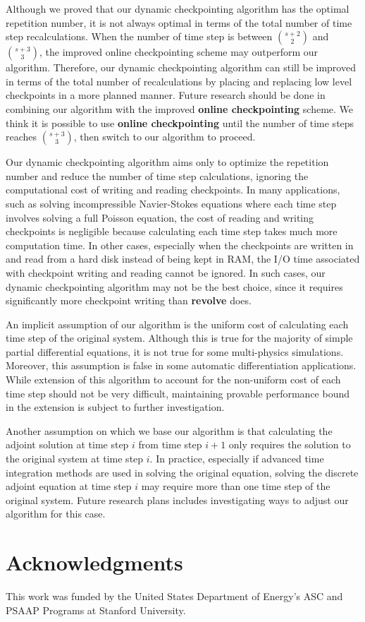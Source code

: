 \documentclass[oneeqnum, onethmnum, onefignum, onetabnum]{siamltex}
\begin{document}
Although we proved that our dynamic checkpointing algorithm has the optimal
repetition number, it is not always optimal in terms of the total number
of time step recalculations.  When the number of time step is between
$\binom{s + 2}{2}$ and $\binom{s + 3}{3}$, the improved online
checkpointing scheme \cite{andrea08} may outperform our algorithm.  Therefore,
our dynamic checkpointing algorithm can still be improved in terms of the total
number of recalculations by placing and replacing low level checkpoints in a
more planned manner.  Future research should be done in combining our algorithm
with the improved {\bf online checkpointing} scheme.  We think it is possible
to use {\bf online checkpointing} until
the number of time steps reaches $\binom{s + 3}{3}$, then switch to our
algorithm to proceed.

Our dynamic checkpointing algorithm aims only to optimize the repetition number
and reduce the number of time step calculations, ignoring the computational
cost of writing and reading checkpoints.  In many applications, such as
solving incompressible Navier-Stokes equations where each time step involves
solving a full Poisson equation, the cost of reading and writing checkpoints
is negligible because calculating each time step takes much more computation
time.  In other cases, especially when the checkpoints are written in and read
from a hard disk instead of being kept in RAM, the I/O time associated with
checkpoint writing and reading cannot be ignored.  In such cases, our dynamic
checkpointing algorithm may not be the best choice, since it requires
significantly more checkpoint writing than {\bf revolve} does.

An implicit assumption of our algorithm is the uniform cost of calculating
each time step of the original system.  Although this is true for the majority
of simple partial differential equations, it is not true for some multi-physics simulations.  Moreover, this assumption is false in some automatic
differentiation applications.  While extension of this algorithm to account for
the non-uniform cost of each time step should not be very difficult, maintaining
provable performance bound in the extension is subject to further investigation.

Another assumption on which we base our algorithm is that calculating the
adjoint solution at time step $i$ from time step $i + 1$ only requires the
solution to the original system at time step $i$.  In practice, especially
if advanced time integration methods are used in solving the original equation,
solving the discrete adjoint equation at time step $i$ may require more than
one time step of the original system.  Future research plans includes
investigating ways to adjust our algorithm for this case.





\section*{Acknowledgments}
This work was funded by the United States Department of Energy's ASC and
PSAAP Programs at Stanford University.


\end{document}
